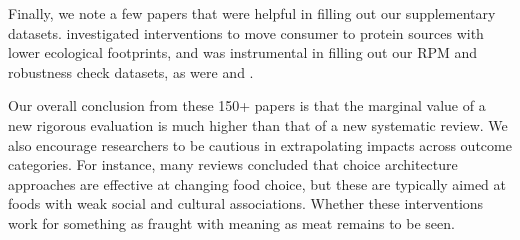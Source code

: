 \documentclass[sn-nature,referee,pdflatex]{sn-jnl}
\begin{document}
Finally, we note a few papers that were helpful in filling out our
supplementary datasets. \citep{ronto2022} investigated interventions to
move consumer to protein sources with lower ecological footprints, and
was instrumental in filling out our RPM and robustness check datasets,
as were \citep{kwasny2022} and \citep{grummon2023}.

Our overall conclusion from these 150+ papers is that the marginal value
of a new rigorous evaluation is much higher than that of a new
systematic review. We also encourage researchers to be cautious in
extrapolating impacts across outcome categories. For instance, many
reviews concluded that choice architecture approaches are effective at
changing food choice, but these are typically aimed at foods with weak
social and cultural associations. Whether these interventions work for
something as fraught with meaning as meat remains to be seen.

\newpage

\renewcommand\refname{References}

\end{document}
